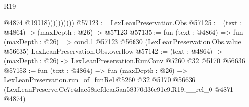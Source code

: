 \begin{lexlean}{R19}
\begin{coremodule}
                        @4874
                        @19018))))))))))
@57123 := LexLeanPreservation.Obs
@57125 := (text : @4864) -> (maxDepth : @26) -> @57123
@57135 := fun (text : @4864) =>
  fun (maxDepth : @26) =>
  cond.{1} @57123 @56630 (LexLeanPreservation.Obs.value @56635) LexLeanPreservation.Obs.overflow
@57142 := (text : @4864) -> (maxDepth : @26) -> LexLeanPreservation.RunConv @5260 @32 @5170 @56636
@57153 := fun (text : @4864) =>
  fun (maxDepth : @26) =>
  LexLeanPreservation.run_of_funRel
    @5260
    @32
    @5170
    @56636
    (LexLeanPreserve.Ce7e4dac58aefdeaa5aa58370d36e91c9.R19.__rel_0 @4871 @4874)
\end{coremodule}
\end{lexlean}
